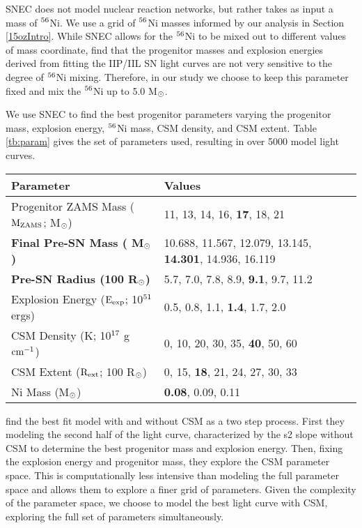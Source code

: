\documentclass[a4paper,fleqn,usenatbib]{mnras}
\newcommand{\msunperiod}{M$\rm{_{\odot}}$}
\begin{document}
SNEC does not model nuclear reaction networks, but rather takes as input a mass of $\rm{{}^{56}}$Ni. 
We use a grid of $\rm{{}^{56}}$Ni masses informed by our analysis in Section \ref{15ozIntro}.
While SNEC allows for the $\rm{{}^{56}}$Ni to be mixed out to different values of mass coordinate, \citet{2017morozova} find that the progenitor masses and explosion energies derived from fitting the IIP/IIL SN light curves are not very sensitive to the degree of $\rm{{}^{56}}$Ni mixing.
Therefore, in our study we choose to keep this parameter fixed and mix the $\rm{{}^{56}}$Ni up to 5.0 M$\rm{_{\odot}}$.

We use SNEC to find the best progenitor parameters varying the progenitor mass, explosion energy, $\rm{{}^{56}}$Ni mass, CSM density, and CSM extent. 
Table \ref{tb:param} gives the set of parameters used, resulting in over 5000 model light curves.
\begin{table*}
\centering
\caption{The grid of parameters used by SNEC. 
The values that best fit the data are in bold. \textbf{The pre-explosion masses are taken from Table 2 of \citet{2016sukhbold}.}}
\label{tb:param}
\begin{tabular}{l|l}
\hline
Parameter & Values \\
\hline
Progenitor ZAMS Mass ($\rm{M_{ZAMS}}$; \msunperiod) & 11, 13, 14, 16, {\bf17}, 18, 21 \\
\textbf{Final Pre-SN Mass ( \msunperiod)} & 10.688, 11.567, 12.079, 13.145, {\bf14.301}, 14.936, 16.119 \\
\textbf{Pre-SN Radius (100 R$\rm{_{\odot}}$) }                    & 5.7, 7.0, 7.8, 8.9, {\bf9.1}, 9.7, 11.2 \\
Explosion Energy ($\rm{E_{exp}}$; 10$\rm{^{51}}$ ergs)   & 0.5, 0.8, 1.1, {\bf 1.4}, 1.7, 2.0 \\
CSM Density (K; 10$\rm{^{17}}$ g $\rm{cm^{-1}}$)            & 0, 10, 20, 30, 35, {\bf40}, 50, 60 \\
CSM Extent ($\rm{R_{ext}}$; 100 R$\rm{_{\odot}}$)           & 0, 15, {\bf18}, 21, 24, 27, 30, 33 \\
Ni Mass (\msunperiod)                                                        & {\bf 0.08}, 0.09, 0.11 \\
\hline
\end{tabular}
\end{table*}
\citet{2018morozova} find the best fit model with and without CSM as a two step process. 
First they modeling the second half of the light curve, characterized by the s2 slope without CSM to determine the best progenitor mass and explosion energy. 
Then, fixing the explosion energy and progenitor mass, they explore the CSM parameter space. 
This is computationally less intensive than modeling the full parameter space and allows them to explore a finer grid of parameters.
Given the complexity of the parameter space, we choose to model the best light curve with CSM, exploring the full set of parameters simultaneously. 
\end{document}
